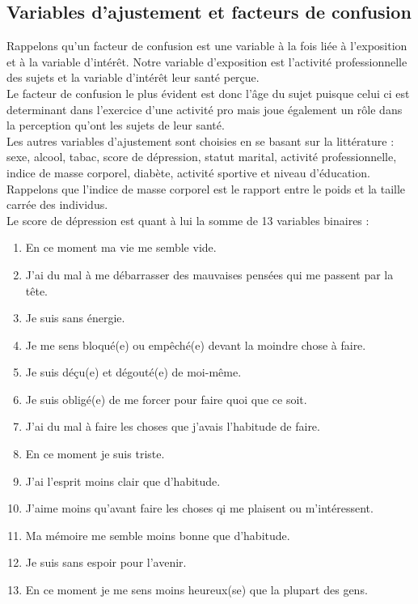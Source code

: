 \documentclass{book}
\begin{document}
\subsection{Variables d'ajustement et facteurs de confusion}
\noindent
Rappelons qu'un facteur de confusion est une variable à la fois liée à l'exposition et à la variable d'intérêt.
Notre variable d'exposition est l'activité professionnelle des sujets et la variable d'intérêt leur santé perçue.\\

\noindent
Le facteur de confusion le plus évident est donc l'âge du sujet puisque celui ci est determinant dans l'exercice d'une activité pro mais joue également un rôle dans la perception qu'ont les sujets de leur santé.\\

\noindent
Les autres variables d'ajustement sont choisies en se basant sur la littérature : sexe, alcool, tabac, score de dépression, statut marital, activité professionnelle, indice de masse corporel, diabète, activité sportive et niveau d'éducation.\\


\noindent
Rappelons que l'indice de masse corporel est le rapport entre le poids et la taille carrée des individus. \\


\noindent
Le score de dépression est quant à lui la somme de 13 variables binaires :
\baselineskip 1pt
\begin{enumerate}
\item En ce moment ma vie me semble vide.
\item J'ai du mal à me débarrasser des mauvaises pensées qui me passent par la tête.
\item Je suis sans énergie.
\item Je me sens bloqué(e) ou empêché(e) devant la moindre chose à faire.
\item Je suis déçu(e) et dégouté(e) de moi-même.
\item Je suis obligé(e) de me forcer pour faire quoi que ce soit.
\item J'ai du mal à faire les choses que j'avais l'habitude de faire.
\item En ce moment je suis triste.
\item J'ai l'esprit moins clair que d'habitude.
\item J'aime moins qu'avant faire les choses qi me plaisent ou m'intéressent.
\item Ma mémoire me semble moins bonne que d'habitude.
\item Je suis sans espoir pour l'avenir.
\item En ce moment je me sens moins heureux(se) que la plupart des gens.
\end{enumerate}
\end{document}

